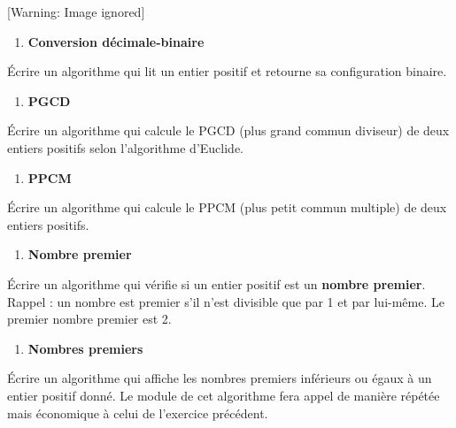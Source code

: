 \begin{center}
 [Warning: Image ignored] %

\end{center}
\liststyleExercice
\setcounter{saveenum}{\value{enumi}}
\begin{enumerate}
\setcounter{enumi}{\value{saveenum}}
\item {\sffamily\bfseries
Conversion décimale-binaire}
\end{enumerate}
{
Écrire un algorithme qui lit un entier positif et retourne sa
configuration binaire. }

\liststyleExercice
\setcounter{saveenum}{\value{enumi}}
\begin{enumerate}
\setcounter{enumi}{\value{saveenum}}
\item {\sffamily\bfseries
PGCD}
\end{enumerate}
{
Écrire un algorithme qui calcule le PGCD (plus grand commun diviseur) de
deux entiers positifs selon l’algorithme d’Euclide.}

\liststyleExercice
\setcounter{saveenum}{\value{enumi}}
\begin{enumerate}
\setcounter{enumi}{\value{saveenum}}
\item {\sffamily\bfseries
PPCM}
\end{enumerate}
{
Écrire un algorithme qui calcule le PPCM (plus petit commun multiple) de
deux entiers positifs.}

\liststyleExercice
\setcounter{saveenum}{\value{enumi}}
\begin{enumerate}
\setcounter{enumi}{\value{saveenum}}
\item {\sffamily\bfseries
Nombre premier}
\end{enumerate}
{
Écrire un algorithme qui vérifie si un entier positif est un
\textbf{nombre premier}. 
Rappel : un nombre est premier s’il n’est divisible que par 1 et par
lui-même. Le premier nombre premier est 2.}

\liststyleExercice
\setcounter{saveenum}{\value{enumi}}
\begin{enumerate}
\setcounter{enumi}{\value{saveenum}}
\item {\sffamily\bfseries
Nombres premiers}
\end{enumerate}
{
Écrire un algorithme qui affiche les nombres premiers inférieurs ou
égaux à un entier positif donné. Le module de cet algorithme fera appel
de manière répétée mais économique à celui de l’exercice précédent.}

